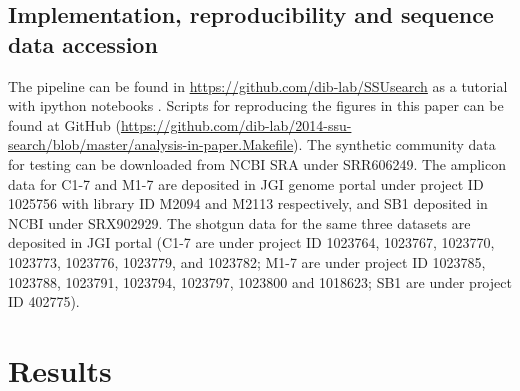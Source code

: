 \documentclass[]{msu-thesis}
\begin{document}
\subsection{Implementation, reproducibility and sequence data accession}
The pipeline can be found in \url{https://github.com/dib-lab/SSUsearch} as a tutorial with ipython notebooks \cite{perez_ipython:_2007}. Scripts for reproducing the figures in this paper can be found at GitHub (\url{https://github.com/dib-lab/2014-ssu-search/blob/master/analysis-in-paper.Makefile}). The synthetic community data for testing can be downloaded from NCBI SRA under SRR606249. The amplicon data for C1-7 and M1-7 are deposited in JGI genome portal under project ID 1025756 with library ID M2094 and M2113 respectively, and SB1 deposited in NCBI under SRX902929. The shotgun data for the same three datasets are deposited in JGI portal (C1-7 are under project ID 1023764, 1023767, 1023770, 1023773, 1023776, 1023779, and 1023782; M1-7 are under project ID 1023785, 1023788, 1023791, 1023794, 1023797, 1023800 and 1018623; SB1 are under project ID 402775).

\section{Results}
\end{document}
